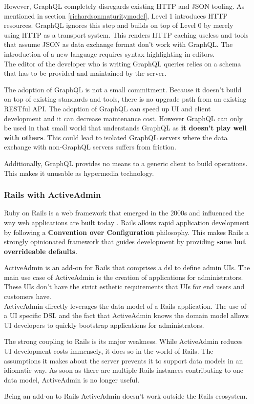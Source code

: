 However, GraphQL completely disregards existing HTTP and JSON tooling. As mentioned in section \ref{richardsonmaturitymodel}, Level 1 introduces HTTP resources. GraphQL ignores this step and builds on top of Level 0 by merely using HTTP as a transport system. This renders HTTP caching useless and tools that assume JSON as data exchange format don't work with GraphQL. The introduction of a new language requires syntax highlighting in editors. \\
The editor of the developer who is writing GraphQL queries relies on a schema that has to be provided and maintained by the server.

The adoption of GraphQL is not a small commitment. Because it doesn't build on top of existing standards and tools, there is no upgrade path from an existing RESTful API. The adoption of GraphQL can speed up UI and client development and it can decrease maintenance cost. However GraphQL can only be used in that small world that understands GraphQL as \textbf{it doesn't play well with others}. This could lead to isolated GraphQL servers where the data exchange with non-GraphQL servers suffers from friction.

Additionally, GraphQL provides no means to a generic client to build operations. This makes it unusable as hypermedia technology.

\subsubsection{Rails with ActiveAdmin}
Ruby on Rails is a web framework that emerged in the 2000s and influenced the way web applications are built today \citep{rubyonrails}. Rails allows rapid application development by following a \textbf{Convention over Configuration} philosophy. This makes Rails a strongly opinionated framework that guides development by providing \textbf{sane but overrideable defaults}.

ActiveAdmin is an add-on for Rails that comprises a \gls{dsl} to define admin UIs. The main use case of ActiveAdmin is the creation of applications for administrators. These UIs don't have the strict esthetic requirements that UIs for end users and customers have. \\
ActiveAdmin directly leverages the data model of a Rails application. The use of a UI specific DSL and the fact that ActiveAdmin knows the domain model allows UI developers to quickly bootstrap applications for administrators.

The strong coupling to Rails is its major weakness. While ActiveAdmin reduces UI development costs immensely, it does so in the world of Rails. The assumptions it makes about the server prevents it to support data models in an idiomatic way. As soon as there are multiple Rails instances contributing to one data model, ActiveAdmin is no longer useful.

Being an add-on to Rails ActiveAdmin doesn't work outside the Rails ecosystem.
